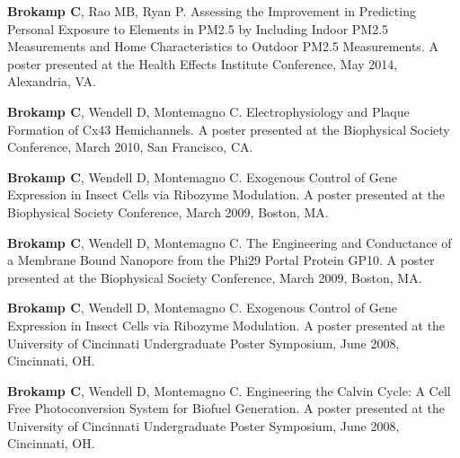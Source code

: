 \documentclass[margin,line]{res}
\newenvironment{list3}{
  \begin{list}{}{%
      \setlength{\itemsep}{0in}
      \setlength{\parsep}{0in} \setlength{\parskip}{0in}
      \setlength{\topsep}{0in} \setlength{\partopsep}{0in} 
      \setlength{\leftmargin}{0in}}}{\end{list}}
\begin{document}
\begin{resume}
\begin{list3}
\item[] \textbf{Brokamp C}, Rao MB, Ryan P. Assessing the Improvement in Predicting Personal Exposure to Elements in PM2.5 by Including Indoor PM2.5 Measurements and Home Characteristics to Outdoor PM2.5 Measurements. A poster presented at the Health Effects Institute Conference, May 2014, Alexandria, VA.
\item[] \textbf{Brokamp C}, Wendell D, Montemagno C. Electrophysiology and Plaque Formation of Cx43 Hemichannels.  A poster presented at the Biophysical Society Conference, March 2010, San Francisco, CA.
\item[] \textbf{Brokamp C}, Wendell D, Montemagno C. Exogenous Control of Gene Expression in Insect Cells via Ribozyme Modulation. A poster presented at the Biophysical Society Conference, March 2009, Boston, MA.
\item[] \textbf{Brokamp C}, Wendell D, Montemagno C.  The Engineering and Conductance of a Membrane Bound Nanopore from the Phi29 Portal Protein GP10.  A poster presented at the Biophysical Society Conference, March 2009, Boston, MA.
\item[] \textbf{Brokamp C}, Wendell D, Montemagno C. Exogenous Control of Gene Expression in Insect Cells via Ribozyme Modulation.  A poster presented at the University of Cincinnati Undergraduate Poster Symposium, June 2008, Cincinnati, OH.
\item[] \textbf{Brokamp C}, Wendell D, Montemagno C. Engineering the Calvin Cycle: A Cell Free Photoconversion System for Biofuel Generation.  A poster presented at the University of Cincinnati Undergraduate Poster Symposium, June 2008, Cincinnati, OH.
\end{list3}


\end{resume}
\end{document}
